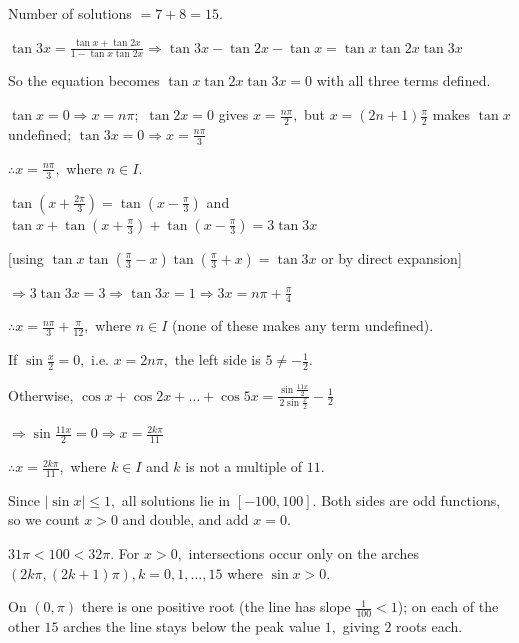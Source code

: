   Number of solutions $= 7 + 8 = 15.$

\item $\tan3x = \frac{\tan x + \tan2x}{1 - \tan x\tan2x} \Rightarrow \tan3x - \tan2x - \tan x = \tan x\tan2x\tan3x$

  So the equation becomes $\tan x\tan2x\tan3x = 0$ with all three terms defined.

  $\tan x = 0\Rightarrow x = n\pi;$ $\tan2x = 0$ gives $x = \frac{n\pi}{2},$ but $x = (2n + 1)\frac{\pi}{2}$ makes $\tan x$
  undefined; $\tan3x = 0\Rightarrow x = \frac{n\pi}{3}$

  $\therefore x = \frac{n\pi}{3},$ where $n\in I.$

\item $\tan\left(x + \frac{2\pi}{3}\right) = \tan\left(x - \frac{\pi}{3}\right)$ and $\tan x + \tan\left(x + \frac{\pi}{3}\right) +
  \tan\left(x - \frac{\pi}{3}\right) = 3\tan3x$

  [using $\tan x\tan\left(\frac{\pi}{3} - x\right)\tan\left(\frac{\pi}{3} + x\right) = \tan3x$ or by direct expansion]

  $\Rightarrow 3\tan3x = 3 \Rightarrow \tan3x = 1 \Rightarrow 3x = n\pi + \frac{\pi}{4}$

  $\therefore x = \frac{n\pi}{3} + \frac{\pi}{12},$ where $n\in I$ (none of these makes any term undefined).

\item If $\sin\frac{x}{2} = 0,$ i.e. $x = 2n\pi,$ the left side is $5\neq -\frac{1}{2}.$

  Otherwise, $\cos x + \cos2x + \ldots + \cos5x = \frac{\sin\frac{11x}{2}}{2\sin\frac{x}{2}} - \frac{1}{2}$

  $\Rightarrow \sin\frac{11x}{2} = 0 \Rightarrow x = \frac{2k\pi}{11}$

  $\therefore x = \frac{2k\pi}{11},$ where $k\in I$ and $k$ is not a multiple of $11.$

\item Since $|\sin x|\leq 1,$ all solutions lie in $[-100, 100].$ Both sides are odd functions, so we count $x > 0$ and
  double, and add $x = 0.$

  $31\pi < 100 < 32\pi.$ For $x > 0,$ intersections occur only on the arches $(2k\pi, (2k + 1)\pi), k = 0, 1, \ldots, 15$ where
  $\sin x > 0.$

  On $(0, \pi)$ there is one positive root (the line has slope $\frac{1}{100} < 1$); on each of the other $15$ arches the
  line stays below the peak value $1,$ giving $2$ roots each.

